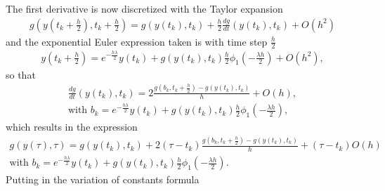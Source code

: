 \documentclass[letterpaper,10pt,english]{jupyterBook}
\begin{document}
\sphinxAtStartPar
The first derivative is now discretized with the Taylor expansion
\begin{equation*}
\begin{split}
g\left(y\left(t_k + \frac{h}{2}\right), t_k + \frac{h}{2} \right) = g(y(t_k), t_k) + \frac{h}{2} \frac{dg}{dt} (y(t_k), t_k) + O(h^2)
\end{split}
\end{equation*}
\sphinxAtStartPar
and the exponential Euler expression taken is with time step \(\frac{h}{2}\)
\begin{equation*}
\begin{split}
  y\left(t_k + \frac{h}{2}\right) = e^{-\frac{h \lambda}{2}}y(t_k) + g(y(t_k), t_k) \frac{h}{2} \phi_1\left( -\frac{\lambda h}{2} \right) + O(h^2),
\end{split}
\end{equation*}
\sphinxAtStartPar
so that
\begin{equation*}
\begin{split}
\frac{dg}{dt} (y(t_k), t_k)  = 2 \frac{g\left(b_k, t_k + \frac{h}{2} \right) - g(y(t_k), t_k)}{h} + O(h), \\
\text{with } b_k =e^{-\frac{h \lambda}{2}}y(t_k) + g(y(t_k), t_k) \frac{h}{2} \phi_1\left( -\frac{\lambda h}{2} \right),
\end{split}
\end{equation*}
\sphinxAtStartPar
which results in the expression
\begin{equation*}
\begin{split}
g(y(\tau), \tau) = g(y(t_k), t_k) + 2(\tau - t_k) \frac{g\left(b_k, t_k + \frac{h}{2}\right) - g(y(t_k), t_k)}{h} + (\tau - t_k)O(h) \\
\text{with } b_k =e^{-\frac{h \lambda}{2}}y(t_k) + g(y(t_k), t_k) \frac{h}{2} \phi_1\left( -\frac{\lambda h}{2} \right).
\end{split}
\end{equation*}
\sphinxAtStartPar
Putting in the variation of constants formula
\end{document}
